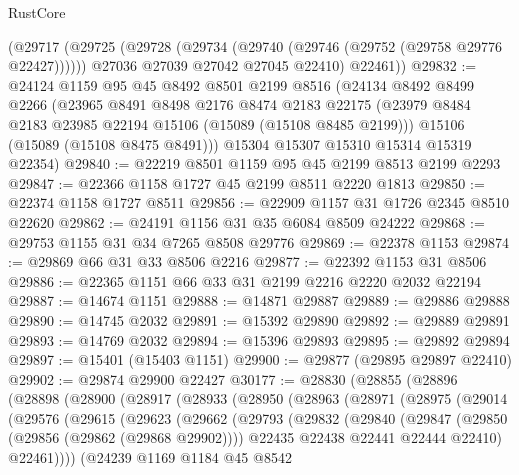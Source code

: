 \begin{lexlean}{RustCore}
\begin{coremodule}
      (@29717
        (@29725
          (@29728 (@29734 (@29740 (@29746 (@29752 (@29758 @29776 @22427))))))
          @27036
          @27039
          @27042
          @27045
          @22410)
        @22461))
@29832 := @24124
    @1159
    @95
    @45
    @8492
    @8501
    @2199
    @8516
    (@24134
      @8492
      @8499
      @2266
      (@23965
        @8491
        @8498
        @2176
        @8474
        @2183
        @22175
        (@23979 @8484 @2183 @23985 @22194 @15106 (@15089 (@15108 @8485 @2199)))
        @15106
        (@15089 (@15108 @8475 @8491)))
      @15304
      @15307
      @15310
      @15314
      @15319
      @22354)
@29840 := @22219 @8501 @1159 @95 @45 @2199 @8513 @2199 @2293
@29847 := @22366 @1158 @1727 @45 @2199 @8511 @2220 @1813
@29850 := @22374 @1158 @1727 @8511
@29856 := @22909 @1157 @31 @1726 @2345 @8510 @22620
@29862 := @24191 @1156 @31 @35 @6084 @8509 @24222
@29868 := @29753 @1155 @31 @34 @7265 @8508 @29776
@29869 := @22378 @1153
@29874 := @29869 @66 @31 @33 @8506 @2216
@29877 := @22392 @1153 @31 @8506
@29886 := @22365 @1151 @66 @33 @31 @2199 @2216 @2220 @2032 @22194
@29887 := @14674 @1151
@29888 := @14871 @29887
@29889 := @29886 @29888
@29890 := @14745 @2032
@29891 := @15392 @29890
@29892 := @29889 @29891
@29893 := @14769 @2032
@29894 := @15396 @29893
@29895 := @29892 @29894
@29897 := @15401 (@15403 @1151)
@29900 := @29877 (@29895 @29897 @22410)
@29902 := @29874 @29900 @22427
@30177 := @28830
    (@28855
      (@28896
        (@28898
          (@28900
            (@28917
              (@28933
                (@28950
                  (@28963
                    (@28971
                      (@28975
                        (@29014
                          (@29576
                            (@29615
                              (@29623
                                (@29662
                                  (@29793
                                    (@29832
                                      (@29840
                                        (@29847
                                          (@29850 (@29856 (@29862 (@29868 @29902))))
                                          @22435
                                          @22438
                                          @22441
                                          @22444
                                          @22410)
                                        @22461))))
                                (@24239
                                  @1169
                                  @1184
                                  @45
                                  @8542

\end{coremodule}
\end{lexlean}
